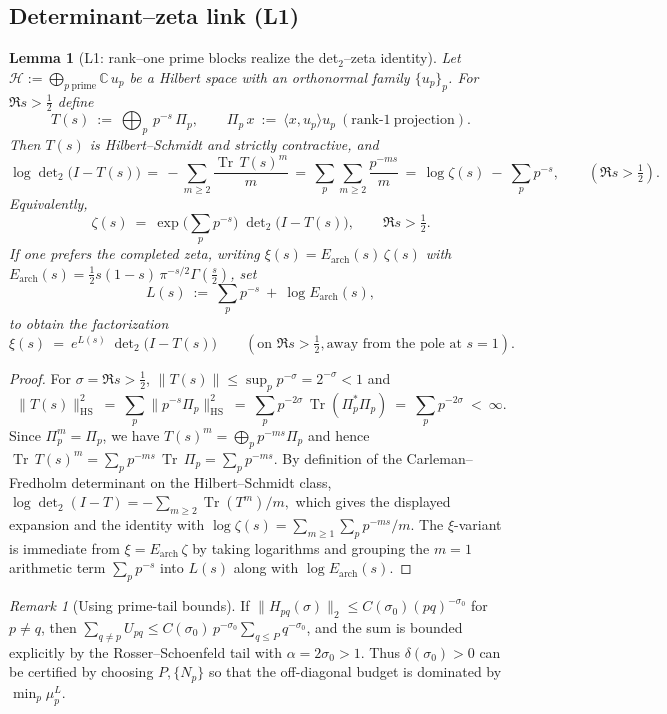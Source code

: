 \documentclass[11pt]{article}
\newtheorem{lemma}[theorem]{Lemma}
\theoremstyle{definition}
\theoremstyle{remark}
\newtheorem{remark}[theorem]{Remark}
\begin{document}
\subsection*{Determinant--zeta link (L1)}
\begin{lemma}[L1: rank--one prime blocks realize the det$_2$--zeta identity]\label{lem:L1-det2-zeta}
Let $\mathcal H:=\bigoplus_{p\ \mathrm{prime}} \mathbb C\,u_p$ be a Hilbert space with an orthonormal family $\{u_p\}_p$. For $\Re s>\tfrac12$ define
\[
  T(s)\ :=\ \bigoplus_{p}\, p^{-s}\,\Pi_p,\qquad \Pi_p\,x\ :=\ \langle x, u_p\rangle u_p\ (\text{rank-}1\ \text{projection}).
\]
Then $T(s)$ is Hilbert--Schmidt and strictly contractive, and
\[
  \log\det\nolimits_{2}\bigl(I-T(s)\bigr)
  \,=\, -\sum_{m\ge2}\frac{\operatorname{Tr}\,T(s)^{m}}{m}
  \,=\, \sum_{p}\sum_{m\ge2}\frac{p^{-ms}}{m}
  \,=\, \log\zeta(s)\ -\ \sum_{p}p^{-s},\qquad (\Re s>\tfrac12).
\]
Equivalently,
\[
  \zeta(s)\ =\ \exp\!\Big(\sum_{p}p^{-s}\Big)\;\det\nolimits_{2}\bigl(I-T(s)\bigr),\qquad \Re s>\tfrac12.
\]
If one prefers the completed zeta, writing $\xi(s)=E_{\mathrm{arch}}(s)\,\zeta(s)$ with $E_{\mathrm{arch}}(s)=\tfrac12 s(1-s)\,\pi^{-s/2}\Gamma(\tfrac{s}{2})$, set
\[
  L(s)\ :=\ \sum_{p}p^{-s}\ +\ \log E_{\mathrm{arch}}(s),
\]
to obtain the factorization
\[
  \xi(s)\ =\ e^{L(s)}\;\det\nolimits_{2}\bigl(I-T(s)\bigr)\qquad (\text{on }\Re s>\tfrac12, \text{away from the pole at }s=1).
\]
\end{lemma}

\begin{proof}
For $\sigma=\Re s>\tfrac12$, $\|T(s)\|\le \sup_p p^{-\sigma}=2^{-\sigma}<1$ and
\[
  \|T(s)\|_{\mathrm{HS}}^{2}\ =\ \sum_{p}\|p^{-s}\Pi_p\|_{\mathrm{HS}}^{2}
  \ =\ \sum_{p} p^{-2\sigma}\,\operatorname{Tr}(\Pi_p^{\!*}\Pi_p)
  \ =\ \sum_{p} p^{-2\sigma}\ <\ \infty.
\]
Since $\Pi_p^{m}=\Pi_p$, we have $T(s)^{m}=\bigoplus_{p} p^{-ms}\Pi_p$ and hence
\(\operatorname{Tr}\,T(s)^{m}=\sum_{p} p^{-ms}\,\operatorname{Tr}\,\Pi_p=\sum_{p}p^{-ms}.\)
By definition of the Carleman--Fredholm determinant on the Hilbert--Schmidt class,
\(\log\det_{2}(I-T)=-\sum_{m\ge2}\operatorname{Tr}(T^{m})/m,\) which gives the displayed expansion and the identity with $\log\zeta(s)=\sum_{m\ge1}\sum_{p}p^{-ms}/m$. The $\xi$-variant is immediate from $\xi=E_{\mathrm{arch}}\,\zeta$ by taking logarithms and grouping the $m=1$ arithmetic term $\sum_pp^{-s}$ into $L(s)$ along with $\log E_{\mathrm{arch}}(s)$.
\end{proof}

\begin{remark}[Using prime-tail bounds]
If $\|H_{pq}(\sigma)\|_2\le C(\sigma_0)(pq)^{-\sigma_0}$ for $p\ne q$, then $\sum_{q\ne p}U_{pq}\le C(\sigma_0)\,p^{-\sigma_0}\sum_{q\le P} q^{-\sigma_0}$, and the sum is bounded explicitly by the Rosser--Schoenfeld tail with $\alpha=2\sigma_0>1$. Thus $\delta(\sigma_0)>0$ can be certified by choosing $P,\{N_p\}$ so that the off-diagonal budget is dominated by $\min_p\mu_p^L$.
\end{remark}
\end{document}
